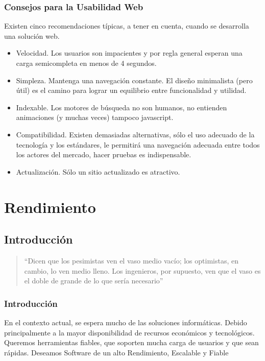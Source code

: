 \documentclass[12pt]{beamer}
\begin{document}
\begin{frame}
 \frametitle{Consejos para la Usabilidad Web}
 Existen cinco recomendaciones típicas, a tener en cuenta, cuando se desarrolla una solución web.
 \begin{itemize}
  \item<2-> Velocidad. Los usuarios son impacientes y por regla general esperan una carga semicompleta en menos de 4 segundos.
  \item<3-> Simpleza. Mantenga una navegación constante. El diseño minimalista (pero útil) es el camino para lograr un equilibrio entre funcionalidad y utilidad.
  \item<4-> Indexable. Los motores de búsqueda no son humanos, no entienden animaciones (y muchas veces) tampoco javascript.
  \item<5-> Compatibilidad. Existen demasiadas alternativas, sólo el uso adecuado de la tecnología y los estándares, le permitirá una navegación adecuada entre todos los actores del mercado, hacer pruebas es indispensable.
  \item<6-> Actualización. Sólo un sitio actualizado es atractivo.
 \end{itemize}
\end{frame}


\section{Rendimiento}
\subsection{Introducción}

\begin{frame}
 \begin{quote}
	``Dicen que los pesimistas ven el vaso medio vacío; los optimistas, en cambio, lo ven medio lleno. Los ingenieros, por supuesto, ven que el vaso es el doble de grande de lo que sería necesario''
 \newline
 \end{quote}
\end{frame}


\begin{frame}
 \frametitle{Introducción}
 En el contexto actual, se espera mucho de las soluciones informáticas. Debido principalmente a la mayor disponibilidad de recursos económicos y tecnológicos.
 \newline
 Queremos herramientas fiables, que soporten mucha carga de usuarios y que sean rápidas.
 \pause
 Deseamos Software de un alto \alert{Rendimiento}, \alert{Escalable} y \alert{Fiable}
\end{frame}
\end{document}

